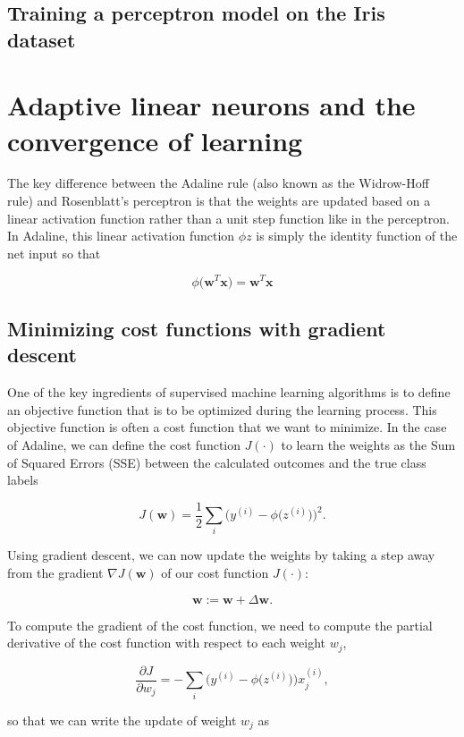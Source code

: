 \documentclass{report}
\begin{document}
\subsection{Training a perceptron model on the Iris dataset}

\section{Adaptive linear neurons and the convergence of learning}

The key difference between the Adaline rule (also known as the Widrow-Hoff rule) and Rosenblatt's perceptron is that the weights are updated based on a linear activation function rather than a unit step function like in the perceptron. In Adaline, this linear activation function $\phi{z}$ is simply the identity function of the net input so that 

\[
\phi \big( \mathbf{w}^T \mathbf{x} \big) = \mathbf{w}^T \mathbf{x}
\]

\subsection{Minimizing cost functions with gradient descent}

One of the key ingredients of supervised machine learning algorithms is to define an objective function that is to be optimized during the learning process. This objective function is often a cost function that we want to minimize. In the case of Adaline, we can define the cost function $J(\cdot)$ to learn the weights as the Sum of Squared Errors (SSE) between the calculated outcomes and the true class labels

\[
J(\mathbf{w}) = \frac{1}{2} \sum_i \bigg(y^{(i)}  - \phi \big(z^{(i)} \big) \bigg)^2.
\]

Using gradient descent, we can now update the weights by taking a step away from the gradient $\nabla J(\mathbf{w})$ of our cost function $J(\mathbf{\cdot})$:

\[
\mathbf{w} := \mathbf{w} + \Delta \mathbf{w}.
\]

To compute the gradient of the cost function, we need to compute the partial derivative of the cost function with respect to each weight $w_j$,

\[
\frac{\partial J}{\partial w_j} = - \sum_i \bigg( y^{(i)} - \phi \big(z^{(i)} \big) \bigg) x_{j}^{(i)}, 
\]

so that we can write the update of weight $w_j$ as 
\end{document}
